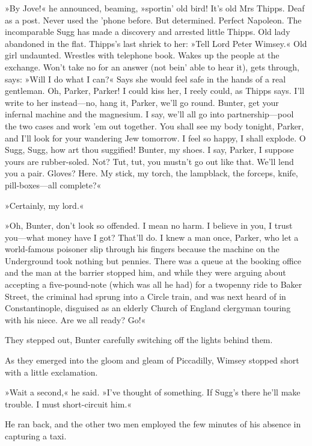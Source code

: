 »By Jove!« he announced, beaming, »sportin' old bird! It's old Mrs Thipps. Deaf as a post. Never used the 'phone before. But determined. Perfect Napoleon. The incomparable Sugg has made a discovery and arrested little Thipps. Old lady abandoned in the flat. Thipps's last shriek to her: »Tell Lord Peter Wimsey.« Old girl undaunted. Wrestles with telephone book. Wakes up the people at the exchange. Won't take no for an answer (not bein' able to hear it), gets through, says: »Will I do what I can?« Says she would feel safe in the hands of a real gentleman. Oh, Parker, Parker! I could kiss her, I reely could, as Thipps says. I'll write to her instead\allowbreak---\allowbreak no, hang it, Parker, we'll go round. Bunter, get your infernal machine and the magnesium. I say, we'll all go into partnership\allowbreak---\allowbreak pool the two cases and work 'em out together. You shall see my body tonight, Parker, and I'll look for your wandering Jew tomorrow. I feel so happy, I shall explode. O Sugg, Sugg, how art thou suggified! Bunter, my shoes. I say, Parker, I suppose yours are rubber-soled. Not? Tut, tut, you mustn't go out like that. We'll lend you a pair. Gloves? Here. My stick, my torch, the lampblack, the forceps, knife, pill-boxes\allowbreak---\allowbreak all complete?«

»Certainly, my lord.«

»Oh, Bunter, don't look so offended. I mean no harm. I believe in you, I trust you\allowbreak---\allowbreak what money have I got? That'll do. I knew a man once, Parker, who let a world-famous poisoner slip through his fingers because the machine on the Underground took nothing but pennies. There was a queue at the booking office and the man at the barrier stopped him, and while they were arguing about accepting a five-pound-note (which was all he had) for a twopenny ride to Baker Street, the criminal had sprung into a Circle train, and was next heard of in Constantinople, disguised as an elderly Church of England clergyman touring with his niece. Are we all ready? Go!«

They stepped out, Bunter carefully switching off the lights behind them.

As they emerged into the gloom and gleam of Piccadilly, Wimsey stopped short with a little exclamation.

»Wait a second,« he said. »I've thought of something. If Sugg's there he'll make trouble. I must short-circuit him.«

He ran back, and the other two men employed the few minutes of his absence in capturing a taxi.

